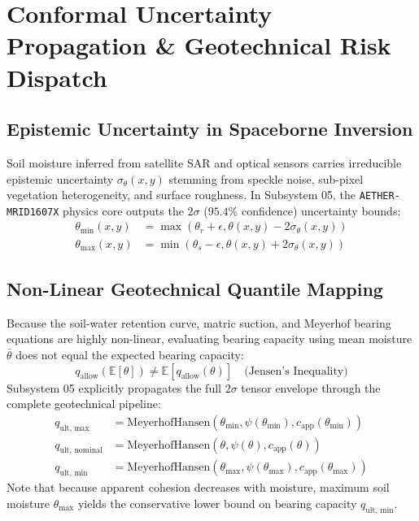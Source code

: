\documentclass[11pt,a4paper]{article}
\theoremstyle{definition}
\theoremstyle{remark}
\begin{document}
\section{Conformal Uncertainty Propagation \& Geotechnical Risk Dispatch}

\subsection{Epistemic Uncertainty in Spaceborne Inversion}
Soil moisture inferred from satellite SAR and optical sensors carries irreducible epistemic uncertainty $\sigma_\theta(x, y)$ stemming from speckle noise, sub-pixel vegetation heterogeneity, and surface roughness. In Subsystem 05, the \texttt{AETHER-MRID1607X} physics core outputs the $2\sigma$ ($95.4\%$ confidence) uncertainty bounds:
\begin{align}
    \theta_{\min}(x, y) &= \max\left( \theta_r + \epsilon, \theta(x, y) - 2 \sigma_\theta(x, y) \right) \\
    \theta_{\max}(x, y) &= \min\left( \theta_s - \epsilon, \theta(x, y) + 2 \sigma_\theta(x, y) \right)
\end{align}

\subsection{Non-Linear Geotechnical Quantile Mapping}
Because the soil-water retention curve, matric suction, and Meyerhof bearing equations are highly non-linear, evaluating bearing capacity using mean moisture $\bar{\theta}$ does not equal the expected bearing capacity:
\begin{equation}
    q_{\text{allow}}(\mathbb{E}[\theta]) \ne \mathbb{E}[q_{\text{allow}}(\theta)] \quad \text{(Jensen's Inequality)}
\end{equation}
Subsystem 05 explicitly propagates the full $2\sigma$ tensor envelope through the complete geotechnical pipeline:
\begin{align}
    q_{\text{ult, max}} &= \text{MeyerhofHansen}\left( \theta_{\min}, \psi(\theta_{\min}), c_{\text{app}}(\theta_{\min}) \right) \\
    q_{\text{ult, nominal}} &= \text{MeyerhofHansen}\left( \theta, \psi(\theta), c_{\text{app}}(\theta) \right) \\
    q_{\text{ult, min}} &= \text{MeyerhofHansen}\left( \theta_{\max}, \psi(\theta_{\max}), c_{\text{app}}(\theta_{\max}) \right)
\end{align}
Note that because apparent cohesion decreases with moisture, maximum soil moisture $\theta_{\max}$ yields the conservative lower bound on bearing capacity $q_{\text{ult, min}}$.
\end{document}
